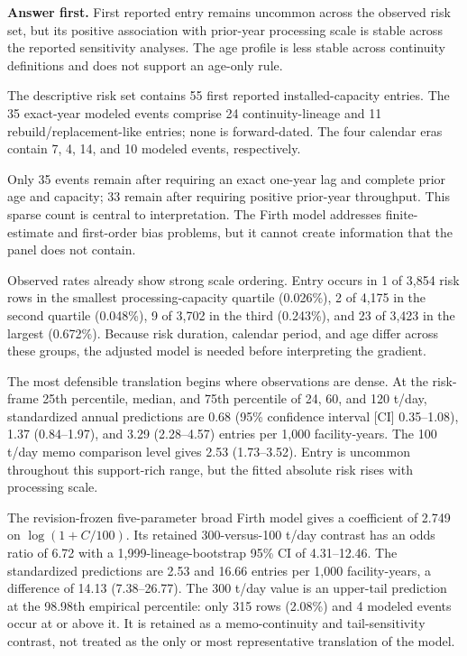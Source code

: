 \documentclass[12pt,a4paper]{article}
\begin{document}
\noindent\textbf{Answer first.} First reported entry remains uncommon across
the observed risk set, but its positive association with prior-year processing
scale is stable across the reported sensitivity analyses. The age profile is
less stable across continuity definitions and does not support an age-only
rule.

The descriptive risk set contains 55 first reported installed-capacity entries.
The 35 exact-year modeled events comprise 24 continuity-lineage and 11
rebuild/replacement-like entries; none is forward-dated. The four calendar eras
contain 7, 4, 14, and 10 modeled events, respectively.

Only 35 events remain after requiring an exact one-year lag and complete prior
age and capacity; 33 remain after requiring positive prior-year throughput.
This sparse count is central to interpretation. The Firth model addresses
finite-estimate and first-order bias problems, but it cannot create information
that the panel does not contain.

Observed rates already show strong scale ordering. Entry occurs in 1 of 3,854
risk rows in the smallest processing-capacity quartile (0.026\%), 2 of 4,175 in
the second quartile (0.048\%), 9 of 3,702 in the third (0.243\%), and 23 of 3,423
in the largest (0.672\%). Because risk duration, calendar period, and age differ
across these groups, the adjusted model is needed before interpreting the
gradient.

The most defensible translation begins where observations are dense. At the
risk-frame 25th percentile, median, and 75th percentile of 24, 60, and 120
t/day, standardized annual predictions are 0.68 (95\% confidence interval [CI]
0.35--1.08), 1.37
(0.84--1.97), and 3.29 (2.28--4.57) entries per 1,000 facility-years. The 100
t/day memo comparison level gives 2.53 (1.73--3.52). Entry is uncommon
throughout this support-rich range, but the fitted absolute risk rises with
processing scale.

The revision-frozen five-parameter broad Firth model gives a coefficient of 2.749 on
$\log(1+C/100)$. Its retained 300-versus-100 t/day contrast has an odds ratio of
6.72 with a 1,999-lineage-bootstrap 95\% CI of 4.31--12.46. The standardized
predictions are 2.53 and 16.66 entries per 1,000 facility-years, a difference of
14.13 (7.38--26.77). The 300 t/day value is an upper-tail prediction at the 98.98th
empirical percentile: only 315 rows (2.08\%) and 4 modeled events occur at or
above it. It is retained as a memo-continuity and tail-sensitivity contrast, not
treated as the only or most representative translation of the model.
\end{document}
